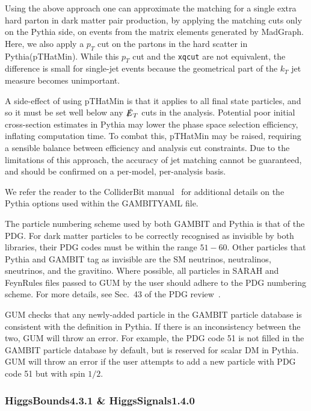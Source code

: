 \documentclass[pdftex,twocolumn,epjc3_preprint,runningheads]{svjour3}
\renewcommand{\_}{\discretionary{\underscore}{}{\underscore}}
\newcommand\yamlvalue[1]{{\YAMLvaluestyle\ttfamily#1}}
\newcommand\term[1]{{\lstset{style=terminal}\lstinline!#1!\lstset{style=cpp}}}
\newcommand\YAMLvaluestyle{\footnotesize\color{blue}\mdseries}
\newcommand{\gambit}{\textsf{GAMBIT}\xspace}
\newcommand{\colliderbit}{\textsf{ColliderBit}\xspace}
\newcommand{\GB}{\gambit}
\newcommand{\pythia}{\textsf{Pythia}\xspace}
\newcommand{\madgraph}{\textsf{MadGraph}\xspace}
\newcommand{\higgsbounds}{\textsf{HiggsBounds}\xspace}
\newcommand{\higgssignals}{\textsf{HiggsSignals}\xspace}
\newcommand{\gum}{\textsf{GUM}\xspace}
\newcommand{\fr}{\textsf{FeynRules}\xspace}
\newcommand{\sarah}{\textsf{SARAH}\xspace}
\newcommand\YAML{\textsf{YAML}\xspace}
\begin{document}
Using the above approach one can approximate the matching for a single extra hard parton in dark matter pair production, by applying the matching cuts  only  on the \pythia side, on events from the matrix elements generated by \madgraph.
Here, we also apply a $p_T$ cut on the partons in the hard scatter in \pythia (\yamlvalue{pTHatMin}). While this $p_T$ cut and the \term{xqcut} are not equivalent, the difference is small for single-jet events because the geometrical part of the $k_T$ jet measure becomes unimportant.

A side-effect of using \yamlvalue{pTHatMin} is that it applies to all final state particles, and so it must be set well below any $\slashed{E}_T$ cuts in the analysis. Potential poor initial cross-section estimates in \pythia  may lower the phase space selection efficiency, inflating computation time. To combat this, \yamlvalue{pTHatMin} may be raised, requiring a sensible balance between efficiency and analysis cut constraints. Due to the limitations of this approach, the accuracy of jet matching cannot be guaranteed, and should be confirmed on a per-model, per-analysis basis.

We refer the reader to the \colliderbit manual~\cite{ColliderBit} for additional details on the \pythia options used within the \GB \YAML file.

The particle numbering scheme used by both \GB and \pythia is that of the PDG.  For dark matter particles to be correctly recognised as invisible by both libraries, their PDG codes must be within the range $51-60$.  Other particles that \pythia and \GB tag as invisible are the SM neutrinos, neutralinos, sneutrinos, and the gravitino.  Where possible, all particles in \sarah and \fr files passed to \gum by the user should adhere to the PDG numbering scheme.  For more details, see Sec.\ 43 of the PDG review~\cite{PDG18}.

\gum checks that any newly-added particle in the \GB particle database is consistent with the definition in \pythia. If there is an inconsistency between the two, \gum will throw an error.  For example, the PDG code 51 is not filled in the \GB particle database by default, but is reserved for scalar DM in \pythia.  \gum will throw an error if the user attempts to add a new particle with PDG code 51 but with spin $1/2$.


\subsubsection{\higgsbounds \textsf{4.3.1} \& \higgssignals \textsf{1.4.0}}
\end{document}
